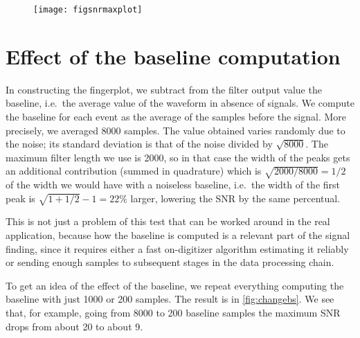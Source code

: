\begin{figure}
    \hspace{0.00\textwidth}
    \texttt{[image: figsnrmaxplot]}
    

\end{figure}

\section{Effect of the baseline computation}

In constructing the fingerplot, we subtract from the filter output value the
baseline, i.e.\ the average value of the waveform in absence of signals. We
compute the baseline for each event as the average of the samples before the
signal. More precisely, we averaged \num{8000} samples. The value obtained
varies randomly due to the noise; its standard deviation is that of the noise
divided by $\sqrt{8000}$. The maximum filter length we use is 2000, so in that
case the width of the peaks gets an additional contribution (summed in
quadrature) which is $\sqrt{2000/8000} = 1/2$ of the width we would have with a
noiseless baseline, i.e.\ the width of the first peak is $\sqrt{1 + 1/2} - 1 =
\SI{22}\%$ larger, lowering the SNR by the same percentual.

This is not just a problem of this test that can be worked around in the real
application, because how the baseline is computed is a relevant part of the
signal finding, since it requires either a fast on-digitizer algorithm
estimating it reliably or sending enough samples to subsequent stages in the
data processing chain.

To get an idea of the effect of the baseline, we repeat everything computing
the baseline with just 1000 or 200 samples. The result is in
\autoref{fig:changebs}. We see that, for example, going from 8000 to 200
baseline samples the maximum SNR drops from about 20 to about 9.



